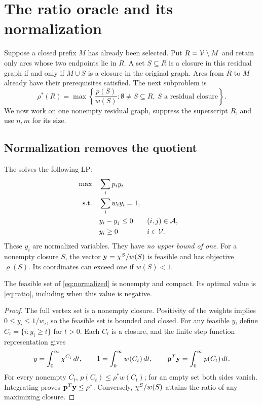 \section{The ratio oracle and its normalization}\label{sec:ratio}

Suppose a closed prefix $M$ has already been selected. Put
$R=\mathcal V\setminus M$ and retain only arcs whose two endpoints lie in $R$.
A set $S\subseteq R$ is a closure in this residual graph if and only if
$M\cup S$ is a closure in the original graph. Arcs from $R$ to $M$ already
have their prerequisites satisfied. The next subproblem is
\begin{equation}\label{eq:ratio}
 \rho^*(R)=\max\left\{\frac{p(S)}{w(S)}:
              \emptyset\ne S\subseteq R,\ S\text{ a residual closure}\right\}.
\end{equation}
We now work on one nonempty residual graph, suppress the superscript $R$,
and use $n,m$ for its size.

\subsection{Normalization removes the quotient}
The \FS{} solves the following LP:
\begin{equation}\label{eq:normalized}
\begin{aligned}
\max\quad &\sum_i p_i y_i\\
\text{s.t.}\quad &\sum_i w_i y_i=1,\\
&y_i-y_j\le0 &&(i,j)\in\mathcal A,\\
&y_i\ge0 &&i\in\mathcal V.
\end{aligned}
\end{equation}
These $y_i$ are normalized variables. They have \emph{no upper bound of one}.
For a nonempty closure $S$, the vector $\mathbf{y}=\chi^S/w(S)$ is feasible and has
objective $\varrho(S)$. Its coordinates can exceed one if $w(S)<1$.

\begin{theorem}\label{thm:normalization}
The feasible set of \eqref{eq:normalized} is nonempty and compact. Its
optimal value is \eqref{eq:ratio}, including when this value is negative.
\end{theorem}
\begin{proof}
The full vertex set is a nonempty closure. Positivity of the weights implies
$0\le y_i\le1/w_i$, so the feasible set is bounded and closed.
For any feasible $y$, define $C_t=\{i:y_i\ge t\}$ for $t>0$.
Each $C_t$ is a closure, and the finite step function representation gives
\[
 y=\int_0^\infty\chi^{C_t}\,dt,\qquad
 1=\int_0^\infty w(C_t)\,dt,\qquad
 \mathbf{p}^T\mathbf{y}=\int_0^\infty p(C_t)\,dt.
\]
For every nonempty $C_t$, $p(C_t)\le\rho^*w(C_t)$; for an empty set both
sides vanish. Integrating proves $\mathbf{p}^T\mathbf{y}\le\rho^*$. Conversely,
$\chi^S/w(S)$ attains the ratio of any maximizing closure.
\end{proof}

